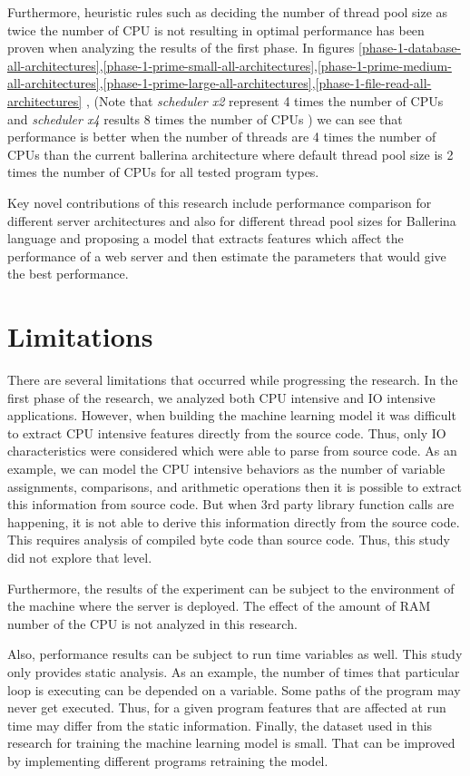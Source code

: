 Furthermore, heuristic rules such as deciding the number of thread pool size as twice the number of CPU \cite{thread_pool_analysis} is not resulting in optimal performance has been proven when analyzing the results of the first phase. In figures \ref{phase-1-database-all-architectures},\ref{phase-1-prime-small-all-architectures},\ref{phase-1-prime-medium-all-architectures},\ref{phase-1-prime-large-all-architectures},\ref{phase-1-file-read-all-architectures} , (Note that \textit{scheduler x2} represent 4 times the number of CPUs and \textit{scheduler x4} results 8 times the number of CPUs ) we can see that performance is better when the number of threads are 4 times the number of CPUs than the current ballerina architecture where default thread pool size is 2 times the number of CPUs for all tested program types. 

Key novel contributions of this research include performance comparison for different server architectures and also for different thread pool sizes for Ballerina language and proposing a model that extracts features which affect the performance of a web server and then estimate the parameters that would give the best performance.

\section{Limitations}

There are several limitations that occurred while progressing the research. In the first phase of the research, we analyzed both CPU intensive and IO intensive applications. However, when building the machine learning model it was difficult to extract CPU intensive features directly from the source code. Thus, only IO characteristics were considered which were able to parse from source code. As an example, we can model the CPU intensive behaviors as the number of variable assignments, comparisons, and arithmetic operations then it is possible to extract this information from source code. But when 3rd party library function calls are happening, it is not able to derive this information directly from the source code. This requires analysis of compiled byte code than source code. Thus, this study did not explore that level.

Furthermore, the results of the experiment can be subject to the environment of the machine where the server is deployed. The effect of the amount of RAM number of the CPU is not analyzed in this research.

Also, performance results can be subject to run time variables as well. This study only provides static analysis. As an example, the number of times that particular loop is executing can be depended on a variable. Some paths of the program may never get executed. Thus, for a given program features that are affected at run time may differ from the static information. Finally, the dataset used in this research for training the machine learning model is small. That can be improved by implementing different programs retraining the model.


